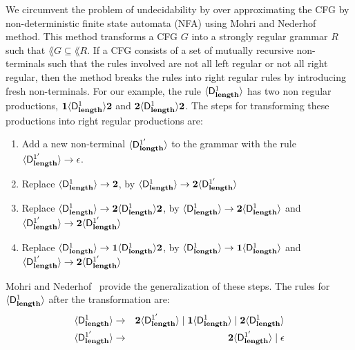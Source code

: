 We circumvent the problem of  undecidability by over approximating the
CFG by non-deterministic finite state automata (NFA) using
Mohri   and   Nederhof~\cite{mohri00regular}   method.   This   method
transforms a CFG $G$ into a strongly  regular grammar $R$ such that $\lang{G} \subseteq \lang{R}$. 
If a CFG consists of a set of mutually recursive non-terminals such that the rules involved are not all left regular or not all right regular, then the method breaks the rules into right regular rules by introducing fresh non-terminals. For our example, the rule  $\var{\Df{\length}{1}}$ has two non regular productions,           $\acdr\var{\Df{\length}{1}}\clazy$          and
$\clazy\var{\Df{\length}{1}}{\clazy}$.  The steps for transforming these productions into
right regular productions are:

\begin{enumerate}
\item
Add a  new non-terminal  $\var{\Df{\length}{1'}}$ to the  grammar with
the rule $\var{\Df{\length}{1'}} \rightarrow \epsilon$.
\item
 Replace     $\var{\Df{\length}{1}}     \rightarrow     \clazy$,     by
 $\var{\Df{\length}{1}} \rightarrow \clazy\var{\Df{\length}{1'}}$
\item
 Replace
 $\var{\Df{\length}{1}} \rightarrow \clazy\var{\Df{\length}{1}}\clazy$,
 by  $\var{\Df{\length}{1}}  \rightarrow  \clazy\var{\Df{\length}{1}}$
 and $\var{\Df{\length}{1'}} \rightarrow \clazy\var{\Df{\length}{1'}}$
\item
  Replace
 $\var{\Df{\length}{1}} \rightarrow \acdr\var{\Df{\length}{1}}\clazy$,
 by $\var{\Df{\length}{1}} \rightarrow \acdr\var{\Df{\length}{1}}$ and
 $\var{\Df{\length}{1'}} \rightarrow \clazy\var{\Df{\length}{1'}}$
\end{enumerate}

Mohri and Nederhof~\cite{mohri00regular} provide the generalization of
these  steps.  The  rules for  
$\var{\Df{\length}{1}}$ after the transformation are:
\begin{eqnarray*}              
  \var{\Df{\length}{1}}   &\rightarrow&   \clazy\var{\Df{\length}{1'}}
  \mid                 \acdr\var{\Df{\length}{1}}                 \mid
  \clazy\var{\Df{\length}{1}}\\  \var{\Df{\length}{1'}}  &\rightarrow&
  \clazy\var{\Df{\length}{1'}} \mid \epsilon
\end{eqnarray*}



